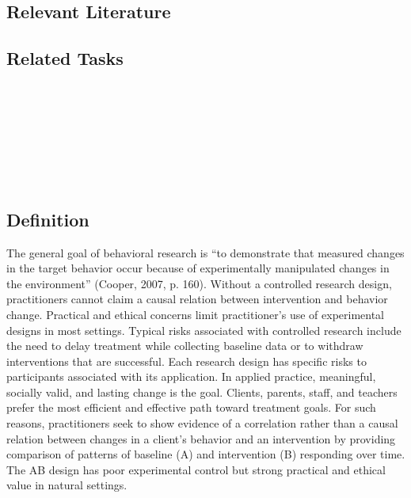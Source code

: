 \subsection{Relevant Literature}
\begin{refsection}
\nocite{cooper2007applied,
        fryling2012impact,
        reed2011parametric,
        wheeler2006treatment,
        wilder2006effects,
        mcintyre2007treatment,
        peterson1982integrity,
        pipkin2010effects}
\printbibliography[heading=none]
\end{refsection}
%
\subsection{Related Tasks}
\fourjOne{}\\
\fourkThree{}\\
\fourkFour{}\\
\fourkFive{}\\
\fourkSix{}\\
\fourkEight{}\\
%
\clearpage \section[\fourjNine{}]{\fourjNine{}%
              }
\subsection{Definition}
The general goal of behavioral research is ``to demonstrate that measured changes in the target behavior occur because of experimentally manipulated changes in the environment'' (Cooper, 2007, p. 160). Without a controlled research design, practitioners cannot claim a causal relation between intervention and behavior change. Practical and ethical concerns limit practitioner's use of experimental designs in most settings. Typical risks associated with controlled research include the need to delay treatment while collecting baseline data or to withdraw interventions that are successful. Each research design has specific risks to participants associated with its application. In applied practice, meaningful, socially valid, and lasting change is the goal. Clients, parents, staff, and teachers prefer the most efficient and effective path toward treatment goals. For such reasons, practitioners seek to show evidence of a correlation rather than a causal relation between changes in a client's behavior and an intervention by providing comparison of patterns of baseline (A) and intervention (B) responding over time. The AB design has poor experimental control but strong practical and ethical value in natural settings.
%
